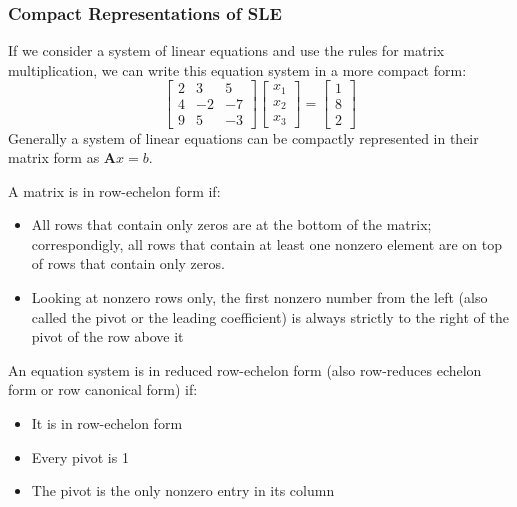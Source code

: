 \subsubsection*{Compact Representations of SLE}
If we consider a system of linear equations and use the rules for matrix multiplication, we can write this equation system in a more compact form:
\[
    \begin{bmatrix}
        2 & 3 & 5 \\
        4 & -2 & -7 \\
        9 & 5 & -3
    \end{bmatrix}
    \begin{bmatrix}
        x_1 \\
        x_2\\
        x_3
    \end{bmatrix}
    =
    \begin{bmatrix}
        1 \\
        8\\
        2
    \end{bmatrix}
\]
Generally a system of linear equations can be compactly represented in their matrix form as $\mathbf{A}x=b$.\\
\begin{definition}
    A matrix is in row-echelon form if:
    \begin{itemize}
        \item All rows that contain only zeros are at the bottom of the matrix; correspondigly, all rows that contain at least one nonzero element are on top of rows that contain only zeros.
        \item Looking at nonzero rows only, the first nonzero number from the left (also called the pivot or the leading coefficient) is always strictly to the right of the pivot of the row above it
    \end{itemize}
\end{definition}
\begin{remark} An equation system is in reduced row-echelon form (also row-reduces echelon form or row canonical form) if:
    \begin{itemize}
        \item It is in row-echelon form
        \item Every pivot is 1
        \item The pivot is the only nonzero entry in its column
    \end{itemize}
\end{remark}

